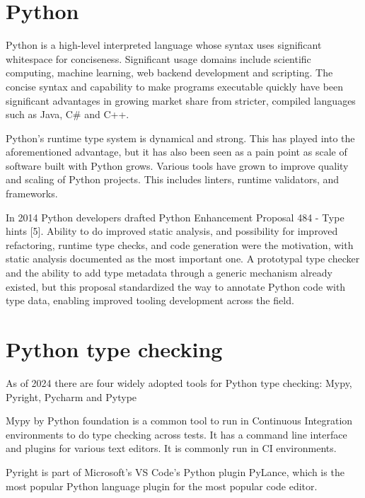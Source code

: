


\section{Python}
Python is a high-level interpreted language whose syntax uses significant whitespace for conciseness. Significant usage domains include scientific computing, machine learning, web backend development and scripting. The concise syntax and capability to make programs executable quickly have been significant advantages in growing market share from stricter, compiled languages such as Java, C\# and C++.

Python's runtime type system is dynamical and strong. This has played into the aforementioned advantage, but it has also been seen as a pain point as scale of software built with Python grows. Various tools have grown to improve quality and scaling of Python projects. This includes linters, runtime validators, and frameworks.

In 2014 Python developers drafted Python Enhancement Proposal 484 - Type hints [5]. Ability to do improved static analysis, and possibility for improved refactoring, runtime type checks, and code generation were the motivation, with static analysis documented as the most important one. A prototypal type checker and the ability to add type metadata through a generic mechanism already existed, but this proposal standardized the way to annotate Python code with type data, enabling improved tooling development across the field.

 
\section{Python type checking}
As of 2024 there are four widely adopted tools for Python type checking: Mypy, Pyright, Pycharm and Pytype %


Mypy by Python foundation is a common tool to run in Continuous Integration environments to do type checking across tests. It has a command line interface and plugins for various text editors. It is commonly run in CI environments. %

Pyright is part of Microsoft's VS Code's Python plugin PyLance, which is the most popular Python language plugin for the most popular code editor.   %

